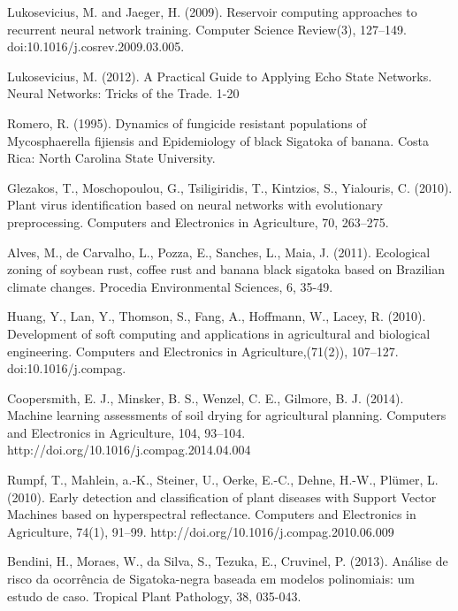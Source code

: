 \documentclass[review]{elsarticle}
\begin{document}
\begin{thebibliography}{1}
 Lukosevicius, M. and Jaeger, H. (2009). Reservoir computing approaches to recurrent neural network training. Computer Science Review(3), 127–149. doi:10.1016/j.cosrev.2009.03.005.

 Lukosevicius, M. (2012). A Practical Guide to Applying Echo State Networks. Neural Networks: Tricks of the Trade. 1-20

  Romero, R. (1995). Dynamics of fungicide resistant populations of Mycosphaerella fijiensis and Epidemiology of black Sigatoka of banana. Costa Rica: North Carolina State University.

 Glezakos, T., Moschopoulou, G., Tsiligiridis, T., Kintzios, S., Yialouris, C. (2010). Plant virus identification based on neural networks with evolutionary preprocessing. Computers and Electronics in Agriculture, 70, 263–275.

 Alves, M., de Carvalho, L., Pozza, E., Sanches, L., Maia, J. (2011). Ecological zoning of soybean rust, coffee rust and banana black sigatoka based on Brazilian climate changes. Procedia Environmental Sciences, 6, 35-49.

  Huang, Y., Lan, Y., Thomson, S., Fang, A., Hoffmann, W., Lacey, R. (2010). Development of soft computing and applications in agricultural and biological engineering. Computers and Electronics in Agriculture,(71(2)), 107–127. doi:10.1016/j.compag.

 Coopersmith, E. J., Minsker, B. S., Wenzel, C. E., Gilmore, B. J. (2014). Machine learning assessments of soil drying for agricultural planning. Computers and Electronics in Agriculture, 104, 93–104. http://doi.org/10.1016/j.compag.2014.04.004

 Rumpf, T., Mahlein, a.-K., Steiner, U., Oerke, E.-C., Dehne, H.-W., Plümer, L. (2010). Early detection and classification of plant diseases with Support Vector Machines based on hyperspectral reflectance. Computers and Electronics in Agriculture, 74(1), 91–99. http://doi.org/10.1016/j.compag.2010.06.009

 Bendini, H., Moraes, W., da Silva, S., Tezuka, E., Cruvinel, P. (2013). Análise de risco da ocorrência de Sigatoka-negra baseada em modelos polinomiais: um estudo de caso. Tropical Plant Pathology, 38, 035-043.


\end{thebibliography}
\end{document}
